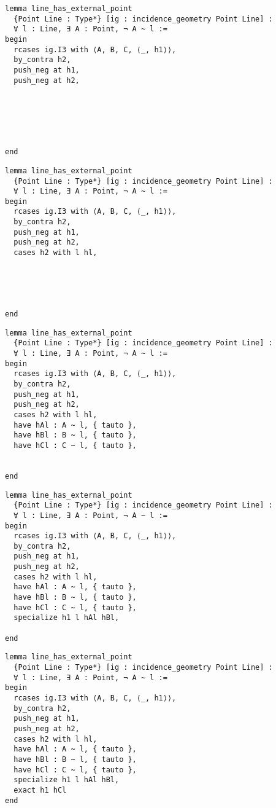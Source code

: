 \documentclass[t]{beamer}
\begin{document}
\begin{frame}[fragile]
\begin{lstlisting}
lemma line_has_external_point 
  {Point Line : Type*} [ig : incidence_geometry Point Line] :
  ∀ l : Line, ∃ A : Point, ¬ A ~ l :=
begin
  rcases ig.I3 with ⟨A, B, C, ⟨_, h1⟩⟩,
  by_contra h2,
  push_neg at h1,
  push_neg at h2,






end
\end{lstlisting}
\end{frame}

\begin{frame}[fragile]
\begin{lstlisting}
lemma line_has_external_point 
  {Point Line : Type*} [ig : incidence_geometry Point Line] :
  ∀ l : Line, ∃ A : Point, ¬ A ~ l :=
begin
  rcases ig.I3 with ⟨A, B, C, ⟨_, h1⟩⟩,
  by_contra h2,
  push_neg at h1,
  push_neg at h2,
  cases h2 with l hl,





end
\end{lstlisting}
\end{frame}

\begin{frame}[fragile]
\begin{lstlisting}
lemma line_has_external_point 
  {Point Line : Type*} [ig : incidence_geometry Point Line] :
  ∀ l : Line, ∃ A : Point, ¬ A ~ l :=
begin
  rcases ig.I3 with ⟨A, B, C, ⟨_, h1⟩⟩,
  by_contra h2,
  push_neg at h1,
  push_neg at h2,
  cases h2 with l hl,
  have hAl : A ~ l, { tauto },
  have hBl : B ~ l, { tauto },
  have hCl : C ~ l, { tauto },


end
\end{lstlisting}
\end{frame}

\begin{frame}[fragile]
\begin{lstlisting}
lemma line_has_external_point 
  {Point Line : Type*} [ig : incidence_geometry Point Line] :
  ∀ l : Line, ∃ A : Point, ¬ A ~ l :=
begin
  rcases ig.I3 with ⟨A, B, C, ⟨_, h1⟩⟩,
  by_contra h2,
  push_neg at h1,
  push_neg at h2,
  cases h2 with l hl,
  have hAl : A ~ l, { tauto },
  have hBl : B ~ l, { tauto },
  have hCl : C ~ l, { tauto },
  specialize h1 l hAl hBl,

end
\end{lstlisting}
\end{frame}

\begin{frame}[fragile]
\begin{lstlisting}
lemma line_has_external_point 
  {Point Line : Type*} [ig : incidence_geometry Point Line] :
  ∀ l : Line, ∃ A : Point, ¬ A ~ l :=
begin
  rcases ig.I3 with ⟨A, B, C, ⟨_, h1⟩⟩,
  by_contra h2,
  push_neg at h1,
  push_neg at h2,
  cases h2 with l hl,
  have hAl : A ~ l, { tauto },
  have hBl : B ~ l, { tauto },
  have hCl : C ~ l, { tauto },
  specialize h1 l hAl hBl,
  exact h1 hCl
end
\end{lstlisting}
\end{frame}
\end{document}
